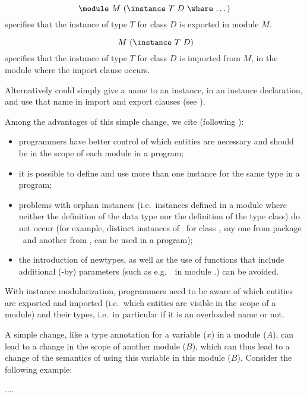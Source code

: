   \[ \text{\module\ $M$ (\instance\ $T$ $D$ \where\ \ldots)} \]
specifies that the instance of type $T$ for class $D$ is exported in
module $M$. 

  \[ \text{\ $M$ (\instance\ $T$ $D$)} \]
specifies that the instance of type $T$ for class $D$ is imported from
$M$, in the module where the import clause occurs.

Alternatively could simply give a name to an instance, in an instance
declaration, and use that name in import and export clauses (see
\cite{Controlling-scope-instances}).

Among the advantages of this simple change, we cite (following
\cite{Controlling-scope-instances}):

\begin{itemize}

  \item programmers have better control of which entities are
    necessary and should be in the scope of each module in a program;

  \item it is possible to define and use more than one instance for
    the same type in a program;

  \item problems with orphan instances (i.e.~instances defined in a
    module where neither the definition of the data type nor the
    definition of the type class) do not occur (for example, distinct
    instances of \Either\ for class \Monad, say one from package
    \mtl\ and another from \transformers, can be used in a program);

  \item the introduction of newtypes, as well as the use of functions
    that include additional (-by) parameters (such as e.g.~\sortBy\ in
    module \Data.\List) can be avoided.

\end{itemize}

With instance modularization, programmers need to be aware of which
entities are exported and imported (i.e.~which entities are visible in
the scope of a module) and their types, i.e.~in particular if it is an
overloaded name or not. 

A simple change, like a type annotation for a variable ($x$) in a
module ($A$), can lead to a change in the scope of another module
($B$), which can thus lead to a change of the semantics of using this
variable in this module ($B$). Consider the following example:

.... 






